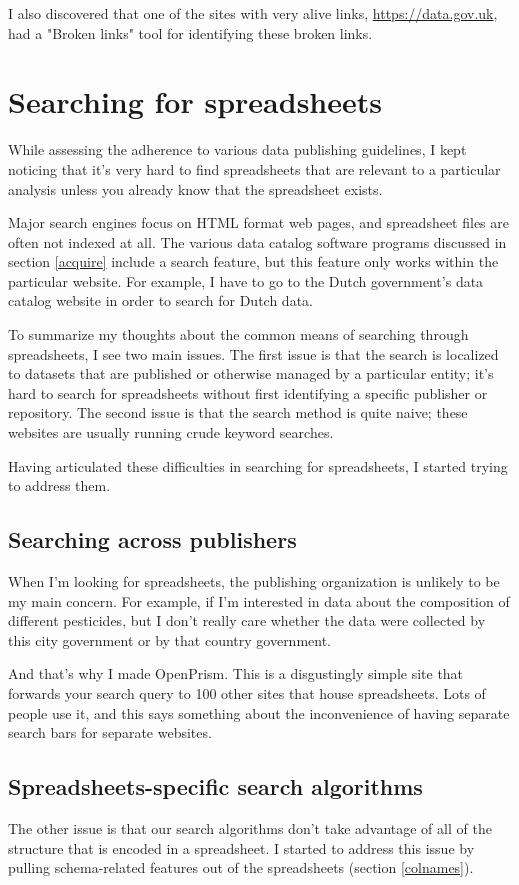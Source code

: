 \documentclass{acm_proc_article-sp}
\begin{document}
I also discovered that one of the sites with very alive links,
\url{https://data.gov.uk}, had a "Broken links" tool for identifying these
broken links.

\section{Searching for spreadsheets}
While assessing the adherence to various data publishing guidelines,
I kept noticing that it's very hard to find spreadsheets that are relevant
to a particular analysis unless you already know that the spreadsheet exists.

Major search engines focus on HTML format web pages, and spreadsheet files
are often not indexed at all. The various data catalog software programs
discussed in section \ref{acquire} include a search feature, but this feature
only works within the particular website. For example, I have to go to the
Dutch government's data catalog website in order to search for Dutch data.

To summarize my thoughts about the common means of searching through
spreadsheets, I see two main issues.
The first issue is that the search is localized to datasets that are published
or otherwise managed by a particular entity; it's hard to search for
spreadsheets without first identifying a specific publisher or repository.
The second issue is that the search method is quite naive; these websites are
usually running crude keyword searches.

Having articulated these difficulties in searching for spreadsheets, I started
trying to address them.

\subsection{Searching across publishers}
When I'm looking for spreadsheets, the publishing organization is unlikely
to be my main concern. For example, if I'm interested in data about the
composition of different pesticides, but I don't really care whether the
data were collected by this city government or by that country government.

And that's why I made OpenPrism. This is a disgustingly simple site that
forwards your search query to 100 other sites that house spreadsheets.
Lots of people use it, and this says something about the inconvenience of
having separate search bars for separate websites.

\subsection{Spreadsheets-specific search algorithms}
The other issue is that our search algorithms don't take advantage of all
of the structure that is encoded in a spreadsheet.
I started to address this issue by pulling schema-related features out
of the spreadsheets (section \ref{colnames}).
\end{document}
